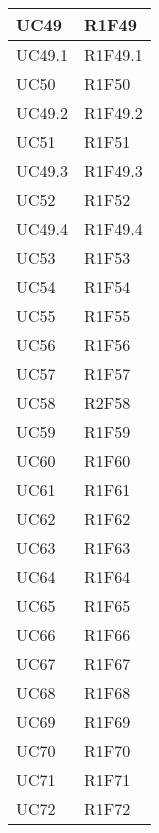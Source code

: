 \begin{center}
\begin{longtable}{|p{44mm}|p{22mm}|}
\hline
UC49 &
R1F49 
\\
\hline
UC49.1 &
R1F49.1 
\\
\hline
UC50 &
R1F50 
\\
\hline
UC49.2 &
R1F49.2 
\\
\hline
UC51 &
R1F51 
\\
\hline
UC49.3 &
R1F49.3 
\\
\hline
UC52 &
R1F52 
\\
\hline
UC49.4 &
R1F49.4 
\\
\hline
UC53 &
R1F53 
\\
\hline
UC54 &
R1F54 
\\
\hline
UC55 &
R1F55 
\\
\hline
UC56 &
R1F56 
\\
\hline
UC57 &
R1F57 
\\
\hline
UC58 &
R2F58 
\\
\hline
UC59 &
R1F59 
\\
\hline
UC60 &
R1F60 
\\
\hline
UC61 &
R1F61 
\\
\hline
UC62 &
R1F62 
\\
\hline
UC63 &
R1F63 
\\
\hline
UC64 &
R1F64 
\\
\hline
UC65 &
R1F65 
\\
\hline
UC66 &
R1F66 
\\
\hline
UC67 &
R1F67 
\\
\hline
UC68 &
R1F68 
\\
\hline
UC69 &
R1F69 
\\
\hline
UC70 &
R1F70 
\\
\hline
UC71 &
R1F71 
\\
\hline
UC72 &
R1F72 
\\
\hline%
		
	\end{longtable}
\end{center}

